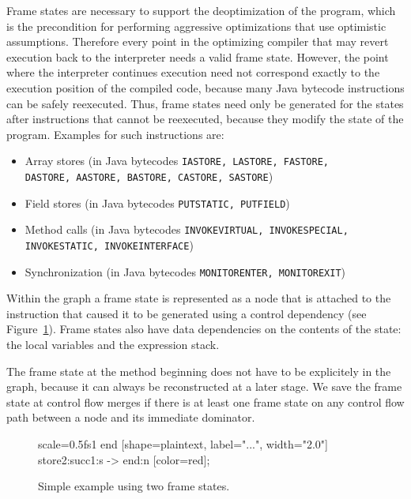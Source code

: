 \documentclass[twocolumn]{svjour3}
\begin{document}
Frame states are necessary to support the deoptimization of the program, which is the precondition for performing aggressive optimizations that use optimistic assumptions.
Therefore every point in the optimizing compiler that may revert execution back to the interpreter needs a valid frame state.
However, the point where the interpreter continues execution need not correspond exactly to the execution position of the compiled code, because many Java bytecode instructions can be safely reexecuted.
Thus, frame states need only be generated for the states after instructions that cannot be reexecuted, because they modify the state of the program.
Examples for such instructions are:

\begin{itemize}
    \item Array stores (in Java bytecodes {\tt IASTORE, LASTORE, FASTORE, \\DASTORE, AASTORE, BASTORE, CASTORE, SASTORE})
    \item Field stores (in Java bytecodes {\tt PUTSTATIC, PUTFIELD})
    \item Method calls (in Java bytecodes {\tt INVOKEVIRTUAL, INVOKESPECIAL, \\INVOKESTATIC, INVOKEINTERFACE})
    \item Synchronization (in Java bytecodes {\tt MONITORENTER, MONITOREXIT})
\end{itemize}

Within the graph a frame state is represented as a node that is attached to the instruction that caused it to be generated using a control dependency (see Figure~\ref{fig:fs1}).
Frame states also have data dependencies on the contents of the state: the local variables and the expression stack.

The frame state at the method beginning does not have to be explicitely in the graph, because it can always be reconstructed at a later stage.
We save the frame state at control flow merges if there is at least one frame state on any control flow path between a node and its immediate dominator.


\begin{figure}[h]
  \centering
\begin{digraphenv}{scale=0.5}{fs1}
    end [shape=plaintext, label="...", width="2.0"]
    store2:succ1:s -> end:n [color=red];
\end{digraphenv}
  \caption{Simple example using two frame states.}
  \label{fig:fs1}
\end{figure}
\end{document}
